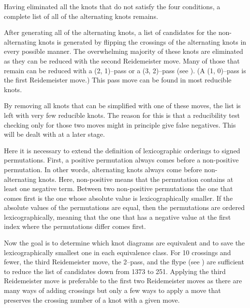 \begin{paper}

Having eliminated all the knots that do not satisfy the four conditions, a
complete list of all of the alternating knots remains.



After generating all of the alternating knots, a list of candidates for the
non-alternating knots is generated by flipping the crossings of the alternating
knots in every possible manner.
The overwhelming majority of these knots are eliminated as they can be reduced
with the second Reidemeister move.
Many of those that remain can be reduced with a (2, 1)--pass or a (3, 2)--pass
(see \figMoves).
(A (1, 0)--pass is the first Reidemeister move.)
This pass move can be found in most reducible knots.


By removing all knots that can be simplified with one of these moves, the list
is left with very few reducible knots.
The reason for this is that a reducibility test checking only for those two
moves might in principle give false negatives.
This will be dealt with at a later stage.



Here it is necessary to extend the definition of lexicographic orderings to
signed permutations.
First, a positive permutation always comes before a non-positive permutation.
In other words, alternating knots always come before non-alternating knots.
Here, non-positive means that the permutation contains at least one negative
term.
Between two non-positive permutations the one that comes first is the one whose
absolute value is lexicographically smaller.
If the absolute values of the permutations are equal, then the permutations are
ordered lexicographically, meaning that the one that has a negative value at the
first index where the permutations differ comes first.


Now the goal is to determine which knot diagrams are equivalent and to save the
lexicographically smallest one in each equivalence class.
For 10 crossings and fewer, the third Reidemeister move, the 2--pass, and the
flype (see \figMoves) are sufficient to reduce the list of candidates down
from 1373 to 251.
Applying the third Reidemeister move is preferable to the first two
Reidemeister moves as there are many ways of adding crossings but only a few
ways to apply a move that preserves the crossing number of a knot with a given
move.


\end{paper}
